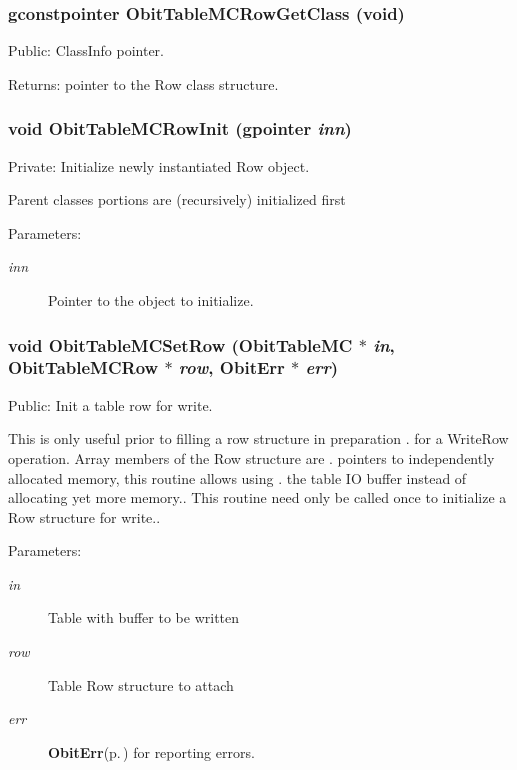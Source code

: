 \subsubsection{\setlength{\rightskip}{0pt plus 5cm}gconstpointer Obit\-Table\-MCRow\-Get\-Class (void)}\label{ObitTableMC_8c_a15}


Public: Class\-Info pointer. 

\begin{Desc}
\item[Returns:]pointer to the Row class structure. \end{Desc}
\subsubsection{\setlength{\rightskip}{0pt plus 5cm}void Obit\-Table\-MCRow\-Init (gpointer {\em inn})}\label{ObitTableMC_8c_a6}


Private: Initialize newly instantiated Row object. 

Parent classes portions are (recursively) initialized first \begin{Desc}
\item[Parameters:]
\begin{description}
\item[{\em inn}]Pointer to the object to initialize. \end{description}
\end{Desc}
\subsubsection{\setlength{\rightskip}{0pt plus 5cm}void Obit\-Table\-MCSet\-Row ({\bf Obit\-Table\-MC} $\ast$ {\em in}, {\bf Obit\-Table\-MCRow} $\ast$ {\em row}, {\bf Obit\-Err} $\ast$ {\em err})}\label{ObitTableMC_8c_a23}


Public: Init a table row for write. 

This is only useful prior to filling a row structure in preparation . for a Write\-Row operation. Array members of the Row structure are . pointers to independently allocated memory, this routine allows using . the table IO buffer instead of allocating yet more memory.. This routine need only be called once to initialize a Row structure for write.. \begin{Desc}
\item[Parameters:]
\begin{description}
\item[{\em in}]Table with buffer to be written \item[{\em row}]Table Row structure to attach \item[{\em err}]{\bf Obit\-Err}{\rm (p.\,\pageref{structObitErr})} for reporting errors. \end{description}
\end{Desc}
